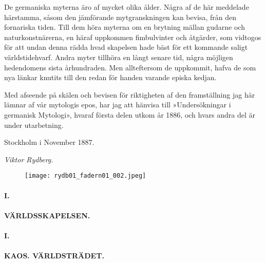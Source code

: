 De germaniska myterna äro af mycket olika ålder. Några af de här
meddelade härstamma, såsom den jämförande mytgranskningen kan bevisa,
från den fornariska tiden. Till dem höra myterna om en brytning mällan
gudarne och naturkonstnärerna, en häraf uppkommen fimbulvinter och
åtgärder, som vidtogos för att undan denna rädda hvad skapelsen hade
bäst för ett kommande saligt världstidehvarf. Andra myter
\protect\hypertarget{lb1625905.xhtmlux5cux23start2}{}{}\protect\hypertarget{lb1625905.xhtmlux5cux23start2-a}{}{}\protect\hypertarget{lb1625905.xhtmlux5cux23start2-b}{}{}\protect\hypertarget{lb1625905.xhtmlux5cux23start2-c}{}{}\protect\hypertarget{lb1625905.xhtmlux5cux23start2-d}{}{}
tillhöra en långt senare tid, några möjligen hedendomens sista
århundraden. Men allteftersom de uppkommit, hafva de som nya länkar
knutits till den redan för handen varande episka kedjan.

Med afseende på skälen och bevisen för riktigheten af den framställning
jag här lämnar af vår mytologis epos, har jag att hänvisa till
»Undersökningar i germanisk Mytologi», hvaraf första delen utkom år
1886, och hvars andra del är under utarbetning.

Stockholm i November 1887.

\emph{Viktor Rydberg.}

\begin{figure}
\centering
\texttt{[image: rydb01\_fadern01\_002.jpeg]}
\caption{}
\end{figure}

\protect\hypertarget{lb1625905.xhtmlux5cux23start3}{}{}\protect\hypertarget{lb1625905.xhtmlux5cux23start3-a}{}{}\protect\hypertarget{lb1625905.xhtmlux5cux23start3-b}{}{}\protect\hypertarget{lb1625905.xhtmlux5cux23start3-c}{}{}\protect\hypertarget{lb1625905.xhtmlux5cux23start3-d}{}{}

\paragraph{I.}

\paragraph{VÄRLDSSKAPELSEN.}

\paragraph{I.}

\paragraph{KAOS. VÄRLDSTRÄDET.}

